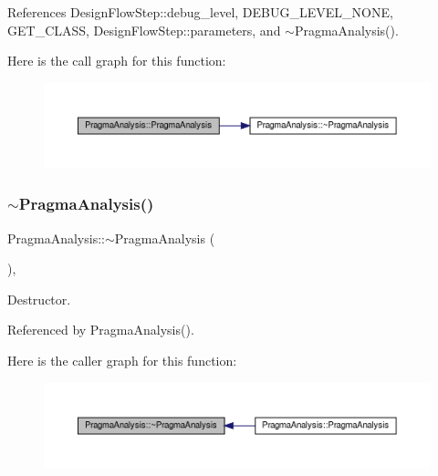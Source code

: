 References Design\+Flow\+Step\+::debug\+\_\+level, D\+E\+B\+U\+G\+\_\+\+L\+E\+V\+E\+L\+\_\+\+N\+O\+NE, G\+E\+T\+\_\+\+C\+L\+A\+SS, Design\+Flow\+Step\+::parameters, and $\sim$\+Pragma\+Analysis().

Here is the call graph for this function\+:
\nopagebreak
\begin{figure}[H]
\begin{center}
\leavevmode
\includegraphics[width=350pt]{d1/d63/classPragmaAnalysis_ac24acf18f50521134b78d1663239498c_cgraph}
\end{center}
\end{figure}
\mbox{\label{classPragmaAnalysis_a552a49a96834beb7ad6439ad037a1fca}} 
\subsubsection{\texorpdfstring{$\sim$\+Pragma\+Analysis()}{~PragmaAnalysis()}}
{\footnotesize\ttfamily Pragma\+Analysis\+::$\sim$\+Pragma\+Analysis (\begin{DoxyParamCaption}{ }\end{DoxyParamCaption})\hspace{0.3cm}{\ttfamily [override]}, {\ttfamily [default]}}



Destructor. 



Referenced by Pragma\+Analysis().

Here is the caller graph for this function\+:
\nopagebreak
\begin{figure}[H]
\begin{center}
\leavevmode
\includegraphics[width=350pt]{d1/d63/classPragmaAnalysis_a552a49a96834beb7ad6439ad037a1fca_icgraph}
\end{center}
\end{figure}


